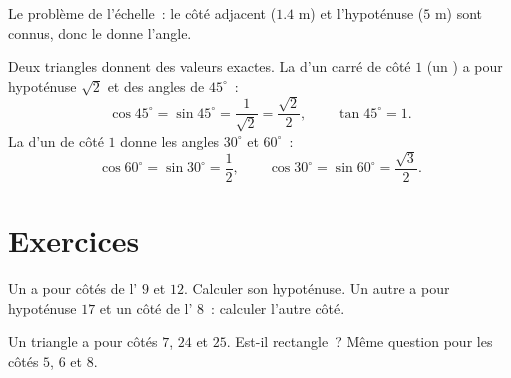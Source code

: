 \begin{omfigure}

{\small Le problème de l'échelle~: le côté adjacent ($1.4$ m) et
l'hypoténuse ($5$ m) sont connus, donc le  donne l'angle.}
\end{omfigure}

\begin{example}\label{ex:g9:trig:special}
Deux triangles donnent des valeurs exactes. La  d'un carré de côté
$1$ (un  ) a pour hypoténuse $\sqrt2$ et des
angles de $45^\circ$~:
\[
\cos 45^\circ = \sin 45^\circ = \frac{1}{\sqrt2} = \frac{\sqrt2}{2},
\qquad \tan 45^\circ = 1 .
\]
La  d'un  de côté $1$ donne les angles
$30^\circ$ et $60^\circ$~:
\[
\cos 60^\circ = \sin 30^\circ = \frac12,
\qquad
\cos 30^\circ = \sin 60^\circ = \frac{\sqrt3}{2}.
\]
\end{example}

\section{Exercices}

\begin{exercise}[$\star$]\label{exo:g9:trig:1}
Un  a pour côtés de l' $9$ et $12$.
Calculer son hypoténuse. Un autre a pour hypoténuse $17$ et un côté de
l' $8$~: calculer l'autre côté.
\end{exercise}

\begin{exercise}[$\star$]\label{exo:g9:trig:2}
Un triangle a pour côtés $7$, $24$ et $25$. Est-il rectangle~? Même
question pour les côtés $5$, $6$ et $8$.
\end{exercise}

